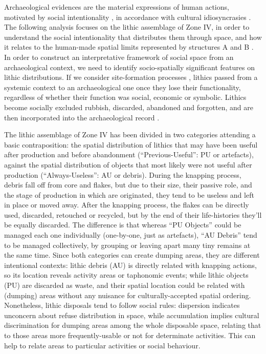 
Archaeological evidences are the material expressions of human actions, motivated by social intentionality \parencite{Barceló_2002}, in accordance with cultural idiosyncrasies \parencite{Otte_2012}. The following analysis focuses on the lithic assemblage of Zone IV, in order to understand the social intentionality that distributes them through space, and how it relates to the human-made spatial limits represented by structures A and B \parencites{Kooyman_2006}{Maximiano_2008}. In order to construct an interpretative framework of social space from an archaeological context, we need to identify socio-spatially significant features on lithic distributions. If we consider site-formation processes \parencite[cf.][]{Schiffer_1976}, lithics passed from a systemic context to an archaeological one once they lose their functionality, regardless of whether their function was social, economic or symbolic. Lithics become socially excluded rubbish, discarded, abandoned and forgotten, and are then incorporated into the archaeological record \parencites{Clark_1991}{Hull_1987}{Murray_1980}{Schiffer_1976}. 

The lithic assemblage of Zone IV has been divided in two categories attending a basic contraposition: the spatial distribution of lithics that may have been useful after production and before abandonment (“Previous-Useful”: PU or artefacts), against the spatial distribution of objects that most likely were not useful after production (“Always-Useless”: AU or debris). During the knapping process, debris fall off from core and flakes, but due to their size, their passive role, and the stage of production in which are originated, they tend to be useless and left in place or moved away. After the knapping process, the flakes can be directly used, discarded, retouched or recycled, but by the end of their life-histories they’ll be equally discarded. The difference is that whereas “PU Objects” could be managed each one individually (one-by-one, just as artefacts), “AU Debris” tend to be managed collectively, by grouping or leaving apart many tiny remains at the same time. Since both categories can create dumping areas, they are different intentional contexts: lithic debris (AU) is directly related with knapping actions, so its location reveals activity areas or taphonomic events; while lithic objects (PU) are discarded as waste, and their spatial location could be related with (dumping) areas without any nuisance for culturally-accepted spatial ordering. Nonetheless, lithic disposals tend to follow social rules: dispersion indicates unconcern about refuse distribution in space, while accumulation implies cultural discrimination for dumping areas among the whole disposable space, relating that to those areas more frequently-usable or not for determinate activities. This can help to relate areas to particular activities or social behaviour.

